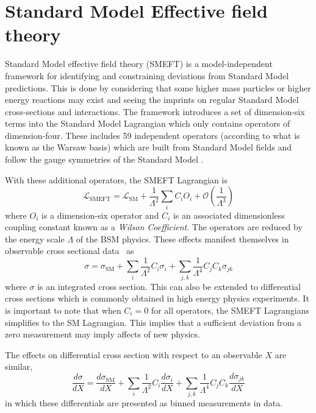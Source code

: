\documentclass[a4paper,11pt]{article}
\begin{document}
\section{Standard Model Effective field theory}

Standard Model effective field theory (SMEFT) is a model-independent framework for identifying and constraining deviations from Standard Model predictions.
This is done by considering that some higher mass particles or higher energy reactions may exist and seeing the imprints on regular Standard Model cross-sections and interactions.
The framework introduces a set of dimension-six terms into the Standard Model Lagrangian which only contains operators of dimension-four.
These includes 59 independent operators (according to what is known as the Warsaw basis) which are built from Standard Model fields and follow the gauge symmetries of the Standard Model \cite{Grzadkowski_2010}.

With these additional operators, the SMEFT Lagrangian is
\begin{equation}\label{eq:smeft_lagrangian}
    \mathcal{L}_{\text{SMEFT}} = \mathcal{L}_{\text{SM}} + \frac{1}{\Lambda^2} \sum\limits_{i} C_{i} O_{i} + \mathcal{O}\left(\frac{1}{\Lambda^3}\right)
\end{equation}
where $O_{i}$ is a dimension-six operator and $C_{i}$ is an associated dimensionless coupling constant known as a \emph{Wilson Coefficient}.
The operators are reduced by the energy scale $\Lambda$ of the BSM physics.
These effects manifest themselves in observable cross sectional data~\cite{Hartland_2019} as
\begin{equation}\label{eq:smeft_cross_section}
    \sigma = \sigma_{\text{SM}} + \sum\limits_{i} \frac{1}{\Lambda^2} C_{i} \sigma_{i} + \sum\limits_{j,k} \frac{1}{\Lambda^4} C_{j} C_{k} \sigma_{j k}
\end{equation}
where $\sigma$ is an integrated cross section. This can also be extended to differential cross sections which is commonly obtained in high energy physics experiments.
It is important to note that when $C_{i}=0$ for all operators, the SMEFT Lagrangians simplifies to the SM Lagrangian.
This implies that a sufficient deviation from a zero measurement may imply affects of new physics.

The effects on differential cross section with respect to an observable $X$ are similar,
\begin{equation}\label{eq:smeft_diff_cross_section}
    \frac{d\sigma}{dX} = \frac{d\sigma_{\text{SM}}}{dX} + \sum\limits_{i} \frac{1}{\Lambda^2} C_{i} \frac{d\sigma_{i}}{dX} + \sum\limits_{j,k} \frac{1}{\Lambda^4} C_{j} C_{k} \frac{d\sigma_{j k}}{dX}
\end{equation}
in which these differentials are presented as binned measurements in data.
\end{document}
